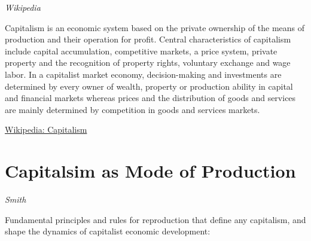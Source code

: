 \documentclass[
]{book}
\begin{document}
\emph{Wikipedia}

Capitalism is an economic system based on the private ownership of the means of production and their operation for profit.
Central characteristics of capitalism include capital accumulation, competitive markets, a price system, private property and the recognition of property rights, voluntary exchange and wage labor.
In a capitalist market economy, decision-making and investments are determined by every owner of wealth, property or production ability in capital and financial markets whereas prices and the distribution of goods and services are mainly determined by competition in goods and services markets.

\href{https://en.wikipedia.org/wiki/Capitalism}{Wikipedia: Capitalism}

\hypertarget{capitalsim-as-mode-of-production}{%
\section{Capitalsim as Mode of Production}\label{capitalsim-as-mode-of-production}}

\emph{Smith}

Fundamental principles and rules for reproduction that define any capitalism,
and shape the dynamics of capitalist economic development:
\end{document}
